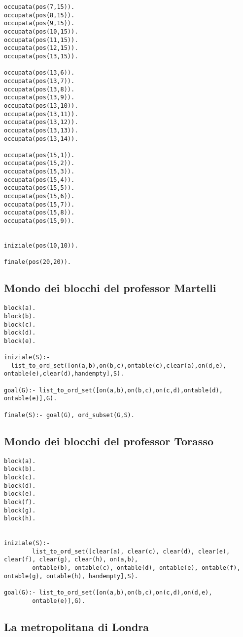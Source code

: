 \begin{lstlisting}
occupata(pos(7,15)).
occupata(pos(8,15)).
occupata(pos(9,15)).
occupata(pos(10,15)).
occupata(pos(11,15)).
occupata(pos(12,15)).
occupata(pos(13,15)).

occupata(pos(13,6)).
occupata(pos(13,7)).
occupata(pos(13,8)).
occupata(pos(13,9)).
occupata(pos(13,10)).
occupata(pos(13,11)).
occupata(pos(13,12)).
occupata(pos(13,13)).
occupata(pos(13,14)).

occupata(pos(15,1)).
occupata(pos(15,2)).
occupata(pos(15,3)).
occupata(pos(15,4)).
occupata(pos(15,5)).
occupata(pos(15,6)).
occupata(pos(15,7)).
occupata(pos(15,8)).
occupata(pos(15,9)).


iniziale(pos(10,10)).

finale(pos(20,20)).
\end{lstlisting}

\subsection{Mondo dei blocchi del professor Martelli}

\begin{lstlisting}
block(a).
block(b).
block(c).
block(d).
block(e).

iniziale(S):-
  list_to_ord_set([on(a,b),on(b,c),ontable(c),clear(a),on(d,e), ontable(e),clear(d),handempty],S).

goal(G):- list_to_ord_set([on(a,b),on(b,c),on(c,d),ontable(d), ontable(e)],G).

finale(S):- goal(G), ord_subset(G,S).
\end{lstlisting}

\subsection{Mondo dei blocchi del professor Torasso}

\begin{lstlisting}
block(a).
block(b).
block(c).
block(d).
block(e).
block(f).
block(g).
block(h).


iniziale(S):-
        list_to_ord_set([clear(a), clear(c), clear(d), clear(e), clear(f), clear(g), clear(h), on(a,b),
        ontable(b), ontable(c), ontable(d), ontable(e), ontable(f), ontable(g), ontable(h), handempty],S).

goal(G):- list_to_ord_set([on(a,b),on(b,c),on(c,d),on(d,e),
        ontable(e)],G).
\end{lstlisting}

\subsection{La metropolitana di Londra}

